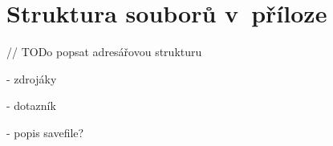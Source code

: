 

\appendix
{}


\chapter{Struktura souborů v~příloze}

// TODo popsat adresářovou strukturu

- zdrojáky

- dotazník

- popis savefile?



